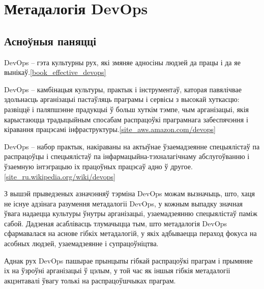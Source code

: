 \section{Метадалогія DevOps}

\subsection{Асноўныя паняцці}

DevOps -- гэта культурны рух, які змяняе адносіны людзей да працы і
да яе вынікаў.\ref{book_effective_devops}

DevOps -- камбінацыя культуры, практык і інструментаў,
каторая павялічвае здольнасць арганізацыі пастаўляць праграмы і сервісы
з высокай хуткасцю: развіццё і паляпшэнне прадукцыі ў больш хуткім тэмпе,
чым арганізацыі, якія карыстаюцца традыцыйным спосабам распрацоўкі
праграмнага забеспячэння і
кіравання працэсамі інфраструктуры.\ref{site_aws.amazon.com/devops}

DevOps -- набор практык, накіраваны на актыўнае ўзаемадзеянне
спецыялістаў па распрацоўцы і спецыялістаў па інфармацыйна-тэхналагічнаму
абслугоўванню і ўзаемную інтэграцыю
іх працоўных працэсаў адно ў другое.\ref{site_ru.wikipedia.org/wiki/devops}

З вышэй прыведзеных азначэнняў тэрміна DevOps можам вызначыць,
што, хаця не існуе адзінага разумення метадалогіі DevOps,
у кожным выпадку значная ўвага надаецца культуры ўнутры арганізацыі,
узаемадзеянню спецыялістаў паміж сабой.
Дадзеная асаблівасць тлумачыцца тым, што метадалогія DevOps сфармавалася
на аснове гібкіх метадалогій, у якіх адбываецца пераход фокуса на
асобных людзей, узаемадзеянне і супрацоўніцтва.

Аднак рух DevOps пашырае прынцыпы гібкай распрацоўкі праграм
і прымяняе іх на ўзроўні арганізацыі ў цэлым,
у той час як іншыя гібкія метадалогіі акцэнтавалі ўвагу толькі на
распрацоўшчыках праграм.
